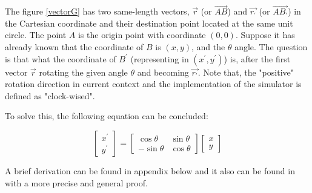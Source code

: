 \par\noindent
The figure \ref{vectorG} has two same-length vectors,  $\vec{r}$ (or $\vec{AB}$) and $\vec{r_{'}}$ (or $\vec{AB_{'}}$) in the Cartesian coordinate and their destination point located at the same unit circle.
The point $A$ is the origin point with coordinate $(0, 0)$. Suppose it has already known that the coordinate of $B$ is
$(x,y)$, and the $\theta$ angle. The question is that what the coordinate of $B^{'} $ (representing in $(x^{'},y^{'})$) is, after the first vector $\vec{r}$ rotating the given angle $\theta$ and becoming $\vec{r_{'}}$.
Note that, the "positive" rotation direction in current context and the implementation of the simulator is defined as "clock-wised".

\par\noindent
To solve this, the following equation can be concluded:

\begin{equation} \label{Equ_ori}
  \begin{bmatrix}
   x^{'} \\ y^{'}
   \end{bmatrix} =   \begin{bmatrix}
      \cos\theta & \sin\theta \\
      -\sin\theta & \cos\theta
    \end{bmatrix} \begin{bmatrix}
      x \\ y
     \end{bmatrix}
\end{equation}


\par\noindent
A brief derivation can be found in appendix below and it also can be found in \cite{Mitnote09} with a more precise and general proof.


